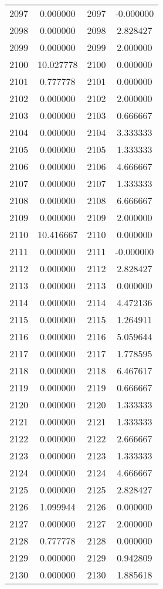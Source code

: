 \documentclass[12pt]{article}
\begin{document}
\begin{longtable}{@{}cccc@{}}
2097 & 0.000000 & 2097 & -0.000000 \\
2098 & 0.000000 & 2098 & 2.828427 \\
2099 & 0.000000 & 2099 & 2.000000 \\
2100 & 10.027778 & 2100 & 0.000000 \\
2101 & 0.777778 & 2101 & 0.000000 \\
2102 & 0.000000 & 2102 & 2.000000 \\
2103 & 0.000000 & 2103 & 0.666667 \\
2104 & 0.000000 & 2104 & 3.333333 \\
2105 & 0.000000 & 2105 & 1.333333 \\
2106 & 0.000000 & 2106 & 4.666667 \\
2107 & 0.000000 & 2107 & 1.333333 \\
2108 & 0.000000 & 2108 & 6.666667 \\
2109 & 0.000000 & 2109 & 2.000000 \\
2110 & 10.416667 & 2110 & 0.000000 \\
2111 & 0.000000 & 2111 & -0.000000 \\
2112 & 0.000000 & 2112 & 2.828427 \\
2113 & 0.000000 & 2113 & 0.000000 \\
2114 & 0.000000 & 2114 & 4.472136 \\
2115 & 0.000000 & 2115 & 1.264911 \\
2116 & 0.000000 & 2116 & 5.059644 \\
2117 & 0.000000 & 2117 & 1.778595 \\
2118 & 0.000000 & 2118 & 6.467617 \\
2119 & 0.000000 & 2119 & 0.666667 \\
2120 & 0.000000 & 2120 & 1.333333 \\
2121 & 0.000000 & 2121 & 1.333333 \\
2122 & 0.000000 & 2122 & 2.666667 \\
2123 & 0.000000 & 2123 & 1.333333 \\
2124 & 0.000000 & 2124 & 4.666667 \\
2125 & 0.000000 & 2125 & 2.828427 \\
2126 & 1.099944 & 2126 & 0.000000 \\
2127 & 0.000000 & 2127 & 2.000000 \\
2128 & 0.777778 & 2128 & 0.000000 \\
2129 & 0.000000 & 2129 & 0.942809 \\
2130 & 0.000000 & 2130 & 1.885618 \\

\end{longtable}
\end{document}

